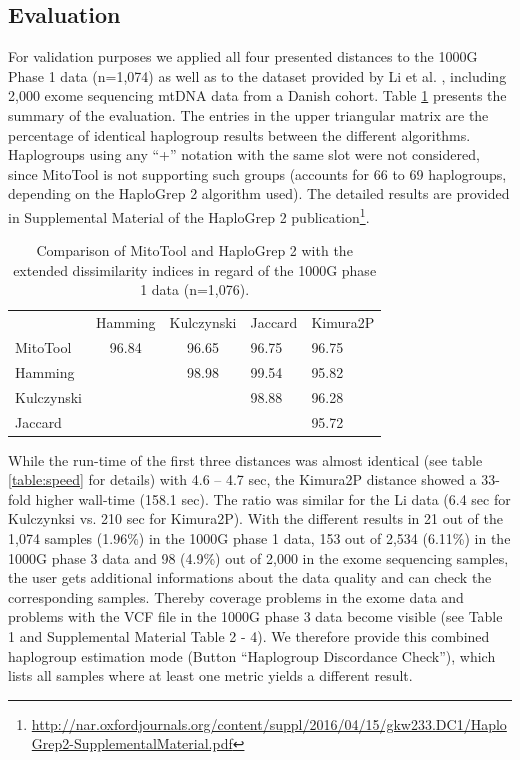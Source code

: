 \subsection{Evaluation}
\label{subs:evaluation}

For validation purposes we applied all four presented distances to the 1000G Phase 1 data (n=1,074) as well as to the dataset provided by Li et al. \cite{Li2014}, including 2,000 exome sequencing mtDNA data from a Danish cohort. Table \ref{table:distances} presents the summary of the evaluation. The entries in the upper triangular matrix are the percentage of identical haplogroup results between the different algorithms. Haplogroups using any “+” notation with the same slot were not considered, since MitoTool is not supporting such groups (accounts for 66 to 69 haplogroups, depending on the HaploGrep 2 algorithm used). The detailed results are provided in Supplemental Material of the HaploGrep 2 publication\footnote{\url{http://nar.oxfordjournals.org/content/suppl/2016/04/15/gkw233.DC1/HaploGrep2-SupplementalMaterial.pdf}}. 
\begin{table}[H]
\centering
\begin{tabular}{lllll}
\cellcolor[HTML]{FFFFFF} & \cellcolor[HTML]{FFFFFF}Hamming & \cellcolor[HTML]{FFFFFF}Kulczynski & Jaccard & Kimura2P \\
MitoTool & \multicolumn{1}{c}{\cellcolor[HTML]{96FFFB}96.84} & \multicolumn{1}{c}{\cellcolor[HTML]{96FFFB}96.65} & \cellcolor[HTML]{96FFFB}96.75 & \cellcolor[HTML]{96FFFB}96.75 \\
Hamming & \multicolumn{1}{c}{\cellcolor[HTML]{FFFFFF}{\color[HTML]{330001} }} & \multicolumn{1}{c}{\cellcolor[HTML]{A9D0FF}98.98} & \cellcolor[HTML]{34CDF9}99.54 & \cellcolor[HTML]{ECF4FF}95.82 \\
Kulczynski & & \cellcolor[HTML]{FFFFFF} & \cellcolor[HTML]{A9D0FF}98.88 & \cellcolor[HTML]{96FFFB}96.28 \\
Jaccard & & & & \cellcolor[HTML]{ECF4FF}95.72 \\
\end{tabular}
\caption{Comparison of MitoTool and HaploGrep 2 with the extended dissimilarity indices in regard of the 1000G phase 1 data (n=1,076).}
\label{table:distances}
\end{table}
While the run-time of the first three distances was almost identical (see table \ref{table:speed} for details) with 4.6 – 4.7 sec, the Kimura2P distance showed a 33-fold higher wall-time (158.1 sec). The ratio was similar for the Li data
(6.4 sec for Kulczynksi vs. 210 sec for Kimura2P). With the different results in 21 out of the 1,074
samples (1.96\%) in the 1000G phase 1 data, 153 out of 2,534 (6.11\%) in the 1000G phase 3 data
and 98 (4.9\%) out of 2,000 in the exome sequencing samples, the user gets additional informations
about the data quality and can check the corresponding samples. Thereby coverage problems in the
exome data and problems with the VCF file in the 1000G phase 3 data become visible (see Table 1
and Supplemental Material Table 2 - 4). We therefore provide this combined haplogroup estimation
mode (Button “Haplogroup Discordance Check”), which lists all samples where at least one metric
yields a different result.


